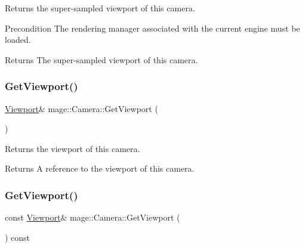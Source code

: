 Returns the super-\/sampled viewport of this camera.

\begin{DoxyPrecond}{Precondition}
The rendering manager associated with the current engine must be loaded. 
\end{DoxyPrecond}
\begin{DoxyReturn}{Returns}
The super-\/sampled viewport of this camera. 
\end{DoxyReturn}
\hypertarget{classmage_1_1_camera_a73deec0aefd507ec97da36069917f97c}{}\label{classmage_1_1_camera_a73deec0aefd507ec97da36069917f97c} 
\subsubsection{\texorpdfstring{Get\+Viewport()}{GetViewport()}\hspace{0.1cm}{\footnotesize\ttfamily [1/2]}}
{\footnotesize\ttfamily \hyperlink{classmage_1_1_viewport}{Viewport}\& mage\+::\+Camera\+::\+Get\+Viewport (\begin{DoxyParamCaption}{ }\end{DoxyParamCaption})\hspace{0.3cm}{\ttfamily [noexcept]}}

Returns the viewport of this camera.

\begin{DoxyReturn}{Returns}
A reference to the viewport of this camera. 
\end{DoxyReturn}
\hypertarget{classmage_1_1_camera_afe08e4f43e57608f8bd45f3fefc89d47}{}\label{classmage_1_1_camera_afe08e4f43e57608f8bd45f3fefc89d47} 
\subsubsection{\texorpdfstring{Get\+Viewport()}{GetViewport()}\hspace{0.1cm}{\footnotesize\ttfamily [2/2]}}
{\footnotesize\ttfamily const \hyperlink{classmage_1_1_viewport}{Viewport}\& mage\+::\+Camera\+::\+Get\+Viewport (\begin{DoxyParamCaption}{ }\end{DoxyParamCaption}) const\hspace{0.3cm}{\ttfamily [noexcept]}}

